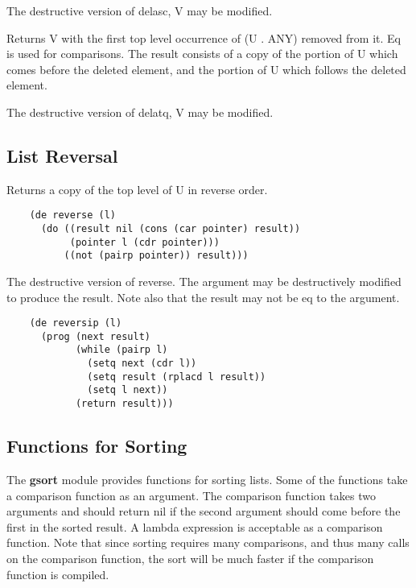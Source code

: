 {    The destructive version of delasc,  V may be modified.
}

{    Returns V with the first top level occurrence of (U  .  ANY)
    removed  from  it.   Eq is used for comparisons.  The result
    consists of a copy of the portion of U  which  comes  before
    the  deleted element, and the portion of U which follows the
    deleted element.
}

{    The destructive version of delatq,  V may be modified.
}
\subsection{List Reversal}


{    Returns a copy of the top level of U in reverse order.
}

\begin{verbatim}
    (de reverse (l)
      (do ((result nil (cons (car pointer) result))
           (pointer l (cdr pointer)))
          ((not (pairp pointer)) result)))
\end{verbatim}

{    The destructive version of reverse.   The  argument  may  be
    destructively  modified  to  produce  the result.  Note also
    that the result may not be eq to the argument.
}

\begin{verbatim}
    (de reversip (l)
      (prog (next result)
            (while (pairp l)
              (setq next (cdr l))
              (setq result (rplacd l result))
              (setq l next))
            (return result)))
\end{verbatim}
\subsection{Functions for Sorting}

The {\bf gsort} module provides functions for sorting lists.  Some
of the functions take a comparison function as an argument.  The
comparison function takes two arguments and should return nil if
the  second  argument should come before the first in the sorted
result.  A lambda  expression  is  acceptable  as  a  comparison
function.    Note  that since sorting requires many comparisons,
and thus many calls on the comparison function, the sort will be
much faster if the comparison function is compiled.


